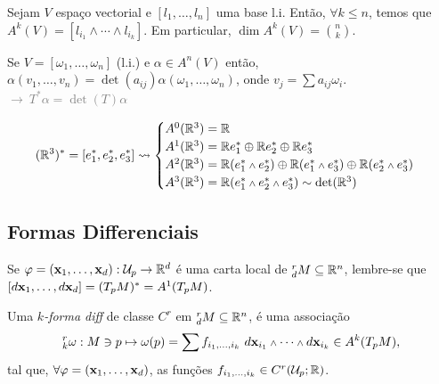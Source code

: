 \begin{theorem}
    Sejam \(V\) espaço vectorial e \([l_1, \ldots, l_n]\) uma base l.i. Então, \(\forall k\leq n \), temos que \(A^k(V) = [l_{i_1}\wedge \cdots \wedge l_{i_k}]\). Em particular, \(\dim A^k(V) = \binom{n}{k}\).   
\end{theorem}

\begin{example}
    Se \(V = [\omega_1, \ldots, \omega_n]\) (l.i.) e \(\alpha \in A^n(V)\) então, \(\alpha(v_1, \ldots, v_n) = \det(a_{ij}) \alpha(\omega_1, \ldots, \omega_n)\), onde \(v_j = \sum a_{ij}\omega_i\). \textcolor{gray}{ \(\rightarrow \ T^*\alpha = \det(T)\alpha\)}  
\end{example}

\begin{example}
    \- \vspace{-1cm}
    \[(\R^3)^{*} = [e_1^*, e_2^*, e_3^*] \leadsto  \begin{cases}
        A^0(\R^3) = \R\\ 
        A^1(\R^3) = \R e_1^* \oplus \R e_2^*\oplus\R e_3^*\\ 
        A^2(\R^3) = \R (e_1^* \wedge e_2^*)\oplus \R (e_1^* \wedge e_3^*)\oplus \R (e_2^* \wedge e_3^*)\\ 
        A^3(\R^3) = \R ( e_1^* \wedge e_2^*\wedge e_3^*) \sim \det(\R^3) \\ 
    \end{cases}\]   
\end{example}

\subsection{Formas Differenciais}



\begin{note}
    Se \( \varphi = (\textbf{x}_1, \ldots, \textbf{x}_d): \mathcal{U}_p \to \mathbb{R}^d\) é uma carta local de \(^r_dM \subseteq \mathbb{R}^n\), lembre-se que \([d\textbf{x}_1, \ldots, d\textbf{x}_d]  = (T_pM)^* = A^1(T_pM)\). %
\end{note}
\- \vspace{-0.8cm}
\begin{definition}
    Uma \emph{$k$-forma diff} de classe \(C^r\) em \(^r_dM\subseteq \mathbb{R}^n\), é uma associação 
    \[^r_k\omega : M \ni p \mapsto \omega(p) = \sum f_{i_1, \ldots, i_k} \ d\x_{i_1}\wedge \cdots \wedge d\x_{i_k} \in A^k(T_pM), \] 
    tal que, \(\forall \varphi = (\textbf{x}_1, \ldots, \textbf{x}_d)\), as funções \(f_{i_1, \ldots, i_k}\in C^r ( \mathcal{U}_p;\mathbb{R})\).
\end{definition}

